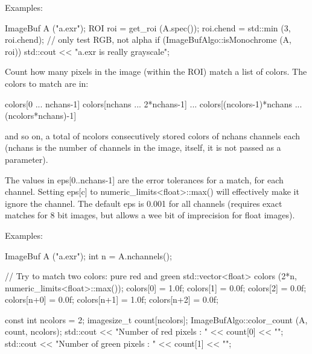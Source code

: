 \smallskip
\noindent Examples:
\begin{code}
    ImageBuf A ("a.exr");
    ROI roi = get_roi (A.spec());
    roi.chend = std::min (3, roi.chend);  // only test RGB, not alpha
    if (ImageBufAlgo::isMonochrome (A, roi))
        std::cout << "a.exr is really grayscale\n";
\end{code}
\apiend


 

Count how many pixels in the image (within the ROI) match a list of colors.
The colors to match are in:

\begin{code}
  colors[0 ... nchans-1]
  colors[nchans ... 2*nchans-1]
  ...
  colors[(ncolors-1)*nchans ... (ncolors*nchans)-1]
\end{code}

\noindent and so on, a total of {\cf ncolors} consecutively stored
colors of {\cf nchans} channels each ({\cf nchans} is the number of
channels in the image, itself, it is not passed as a parameter).

The values in {\cf eps[0..nchans-1]} are the error tolerances for a
match, for each channel.  Setting {\cf eps[c]} to
{\cf numeric_limits<float>::max()} will effectively make it ignore the
channel.  The default {\cf eps} is 0.001
for all channels (requires exact matches for 8 bit images, but
allows a wee bit of imprecision for {\cf float} images).

\smallskip
\noindent Examples:
\begin{code}
    ImageBuf A ("a.exr");
    int n = A.nchannels();

    // Try to match two colors: pure red and green
    std::vector<float> colors (2*n, numeric_limits<float>::max());
    colors[0] = 1.0f; colors[1] = 0.0f; colors[2] = 0.0f;
    colors[n+0] = 0.0f; colors[n+1] = 1.0f; colors[n+2] = 0.0f;

    const int ncolors = 2;
    imagesize_t count[ncolors];
    ImageBufAlgo::color_count (A, count, ncolors);
    std::cout << "Number of red pixels   : " << count[0] << "\n";
    std::cout << "Number of green pixels : " << count[1] << "\n";
\end{code}
\apiend


